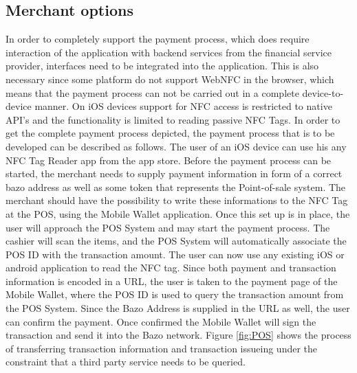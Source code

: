 \subsection{Merchant options}\label{merchantoptions}
In order to completely support the payment process, which does require interaction of the application with backend services from the financial service provider, interfaces need to be integrated into the application.
This is also necessary since some platform do not support WebNFC in the browser, which means that the payment process can not be carried out in a complete device-to-device manner. On iOS devices support for NFC access is restricted to native API's and the functionality is limited to reading passive NFC Tags.
In order to get the complete payment process depicted, the payment process that is to be developed can be described as follows. The user of an iOS device can use his any NFC Tag Reader app from the app store. Before the payment process can be started, the merchant needs to supply payment information in form of a correct bazo address as well as some token that represents the Point-of-sale system. The merchant should have the possibility to write these informations to the NFC Tag at the POS, using the Mobile Wallet application.
Once this set up is in place, the user will approach the POS System and may start the payment process. The cashier will scan the items, and the POS System will automatically associate the POS ID with the transaction amount. The user can now use any existing iOS or android application to read the NFC tag. Since both payment and transaction information is encoded in a URL, the user is taken to the payment page of the Mobile Wallet, where the POS ID is used to query the transaction amount from the POS System. Since the Bazo Address is supplied in the URL as well, the user can confirm the payment. Once confirmed the Mobile Wallet will sign the transaction and send it into the Bazo network. Figure
\ref{fig:POS} shows the process of transferring transaction information and transaction issueing under the constraint that a third party service needs to be queried.

